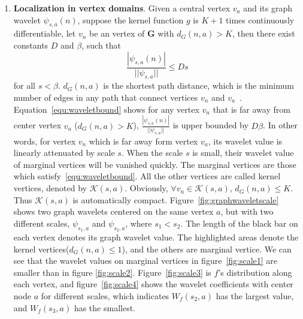 \begin{enumerate}
\item \textbf{Localization in vertex domains}. Given a central vertex $v_a$ and its graph wavelet $\psi_{s,a}(n)$, suppose the kernel function $g$ is $K+1$ times continuously differentiable, let $v_n$ be an vertex of $\mathbf{G}$ with $d_G(n,a)>K$, then there exist constants $D$ and $\beta$, such that
\begin{equation}
\label{equ:waveletbound}
\frac{|\psi_{s,a}(n)|}{||\psi_{s,a}||}\leq Ds
\end{equation} for all $s<\beta$.
$d_G(n,a)$ is the shortest path distance, which is the minimum number of edges in any path that connect vertices $v_n$ and $v_a$~\cite{hammond2011wavelets}. Equation~\ref{equ:waveletbound} shows for any vertex $v_n$ that is far away from center vertex $v_a$ ($d_G(n,a)>K$), $\frac{|\psi_{s,a}(n)|}{||\psi_{s,a}||}$ is upper bounded by $D\beta$. In other words, for vertex $v_n$ which is far away form vertex $v_a$, its wavelet value is linearly attenuated by scale $s$.  When the scale $s$ is small, their wavelet value of marginal vertices will be vanished quickly. The marginal vertices are those which satisfy~\ref{equ:waveletbound}. All the other vertices are called kernel vertices, denoted by $\mathcal{K}(s,a)$. Obviously,   $\forall v_n \in \mathcal{K}(s,a)$,  $d_G(n,a)\le K$. Thus $\mathcal{K}(s,a)$ is automatically compact.
Figure~\ref{fig:graphwaveletscale} shows two graph wavelets centered on the same vertex $a$, but with two different scales, $\psi_{s_1,a}$ and $\psi_{s_2, a}$, where $s_1<s_2$. The length of the black bar on each vertex denotes its graph wavelet value. The highlighted areas denote the kernel vertices($d_G(n,a)\le 1$), and the others are marginal vertice. We can see that the wavelet values  on marginal vertices in figure~\ref{fig:scale1} are smaller than in figure \ref{fig:scale2}. Figure~\ref{fig:scale3} is $f$'s distribution along each vertex, and figure~\ref{fig:scale4} shows the wavelet coefficients with center node $a$ for different scales, which indicates $W_f(s_2,a)$ has the largest value, and $W_f(s_3,a)$ has the smallest.

\end{enumerate}


